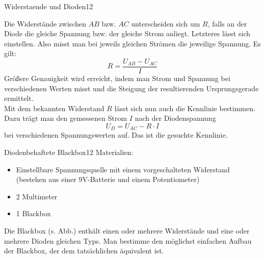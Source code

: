 \begin{problem}{Widerstaende und Dioden}{12}
\begin{expsolution}
Die Widerstände zwischen $AB$ bzw. $AC$ unterscheiden sich um $R$, falls an der Diode die gleiche Spannung bzw. der gleiche Strom anliegt. Letzteres lässt sich einstellen. Also misst man bei jeweils gleichen Strömen die jeweilige Spannung. Es gilt:
\[
 R = \frac{U_{AB}-U_{AC}}{I}
\]
Größere Genauigkeit wird erreicht, indem man Strom und Spannung bei verschiedenen Werten misst und die Steigung der resultierenden Ursprungsgerade ermittelt.\\

Mit dem bekannten Widerstand $R$ lässt sich nun auch die Kennlinie bestimmen. Dazu trägt man den gemessenen Strom $I$ nach der Diodenspannung
\[
 U_D = U_{AC} -R\cdot I
\]
bei verschiedenen Spannungswerten auf. Das ist die gesuchte Kennlinie.
\end{expsolution}
\end{problem}



\begin{problem}{Diodenbehaftete Blackbox}{12}
Materialien:
\begin{itemize}
\item Einstellbare Spannungsquelle mit einem vorgeschalteten Widerstand (bestehen aus einer 9V-Batterie und einem Potentiometer)
\item 2 Multimeter
\item 1 Blackbox
\end{itemize}
Die Blackbox (s. Abb.) enthält einen oder mehrere Widerstände und eine oder mehrere Dioden gleichen Typs. Man bestimme den möglichst einfachen Aufbau der Blackbox, der dem tatsächlichen äquivalent ist.
% 
\end{problem}




